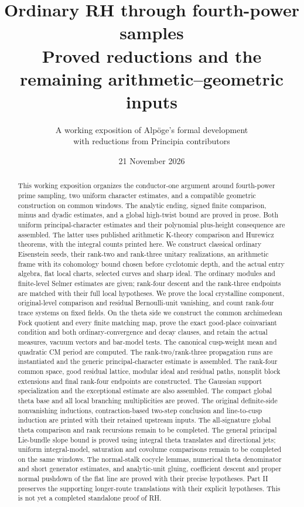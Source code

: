 \documentclass[10pt]{article}
\title{Ordinary RH through fourth-power samples\\[4pt]
\large Proved reductions and the remaining arithmetic--geometric inputs}
\author{A working exposition of Alpöge's formal development\\
with reductions from Principia contributors}
\date{21 November 2026}
\theoremstyle{definition}
\theoremstyle{plain}
\begin{document}
\maketitle
\begin{abstract}
This working exposition organizes the conductor-one argument around
fourth-power prime sampling, two uniform character estimates, and a
compatible geometric construction on common windows.
The analytic ending, signed finite comparison, minus and dyadic estimates,
and a global high-twist bound are proved in prose.
Both uniform principal-character estimates and their polynomial
plus-height consequence are assembled.
The latter uses published arithmetic K-theory comparison and Hurewicz
theorems, with the integral counts printed here.
We construct classical ordinary Eisenstein seeds, their rank-two and
rank-three unitary realizations, an arithmetic frame with its cohomology
bound chosen before cyclotomic depth, and the actual entry algebra,
flat local charts, selected curves and sharp ideal.
The ordinary modules and finite-level Selmer estimates are given;
rank-four descent and the rank-three endpoints are matched
with their full local hypotheses. We prove the local crystalline
component, original-level comparison and residual Bernoulli-unit
vanishing, and count rank-four trace systems on fixed fields.
On the theta side we construct the common archimedean Fock quotient
and every finite matching map, prove the
exact good-place coinvariant condition and both ordinary-convergence
and decay clauses, and retain the actual measures, vacuum vectors and
bar-model tests. The canonical cusp-weight mean and quadratic CM
period are computed.
The rank-two/rank-three propagation runs are instantiated and the
generic principal-character estimate is assembled. The rank-four
common space, good residual lattice, modular ideal and residual
paths, nonsplit block extensions and final rank-four endpoints
are constructed. The Gaussian support specialization and the exceptional estimate
are also assembled. The compact global theta
base and all local branching multiplicities are proved.
The original definite-side nonvanishing inductions, contraction-based
two-step conclusion and line-to-cusp induction are printed with their
retained upstream inputs. The all-signature global theta comparison
and rank recursions remain to be completed. The general principal Lie-bundle slope
bound is proved using integral theta translates and directional
jets; uniform integral-model, saturation and covolume comparisons
remain to be completed on the same windows.
The normal-stalk cocycle lemmas, numerical theta denominator and short
generator estimates, and analytic-unit gluing, coefficient descent and
proper normal pushdown of the flat line are proved with their precise
hypotheses. Part II preserves the supporting
longer-route translations with their explicit hypotheses.
This is not yet a completed standalone proof of RH.
\end{abstract}
\begingroup\small
\tableofcontents
\endgroup
\clearpage

\end{document}
